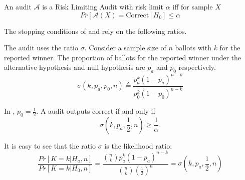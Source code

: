 \begin{definition}
An audit $\mathcal{A}$ is a Risk Limiting Audit with 
risk limit $\alpha$ iff for sample $X$
$$
Pr[\mathcal{A}(X) 
= \text{Correct} \,|\, H_0]\le \alpha
$$
\end{definition}

The stopping conditions of \BRAVO and \Minerva rely on the following ratios.

\begin{definition} \label{def:bravo-ratio} The \BRAVO audit uses the ratio $\sigma$. Consider a sample size of $n$ ballots with $k$ for the reported winner. The proportion of ballots for the reported winner under the alternative hypothesis and null hypothesis are $p_a$ and $p_0$ respectively.
\begin{equation}
    \sigma(k, p_a, p_0, n) \triangleq \frac{p_a^{k} (1-p_a)^{n-k}}{p_0^{k} (1-p_0)^{n-k}} 
    \label{eqn:bravoratio}
\end{equation}
\end{definition}

In \BRAVO, $p_0=\frac{1}{2}$. A \BRAVO audit outputs correct if and only if
$$\sigma(k,p_a,\frac{1}{2},n)\ge \frac{1}{\alpha}.$$

It is easy to see that the ratio $\sigma$ is the 
likelihood ratio:
$$
\frac{Pr[K=k|H_a,n]}{Pr[K=k|H_0,n]}= \frac{\binom{n}{k}p_a^{k} (1-p_a)^{n-k}}{\binom{n}{k}(\frac{1}{2})^n} =\sigma(k, p_a, \frac{1}{2}, n)
$$

\begin{comment}
\begin{definition}[$(\alpha,p)$-\BRAVO ]\label{def:bravo}  An audit $\mathcal{A}$ is the \B~$(\alpha, p)$-\BRAVO audit iff the following stopping condition is tested at each ballot draw. If the sample $X$ is of size $n$ and has $k$ ballots for the winner,  
\begin{equation}
    \mathcal{A}(X) =  \left\{ \begin{array}{ll} \text{Correct} & ~\sigma(k, p, \frac{1}{2}, n) 
        \geq \frac{1}{\alpha}\\
        Undetermined & ~else 
    \end{array}
    \right .
    \label{eqn:bravo}
\end{equation}
\end{definition}
\end{comment}

